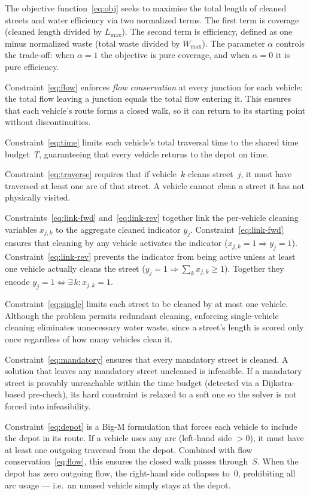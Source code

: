 \documentclass[11pt]{article}
\begin{document}
The objective function~\eqref{eq:obj} seeks to maximise the total length of
cleaned streets and water efficiency via two normalized terms. The first
term is coverage (cleaned length divided by $L_{\max}$). The second term is
efficiency, defined as one minus normalized waste (total waste divided by
$W_{\max}$).  The parameter $\alpha$ controls the trade-off: when
$\alpha = 1$ the objective is pure coverage, and when $\alpha = 0$ it is
pure efficiency.

Constraint~\eqref{eq:flow} enforces \emph{flow conservation} at every
junction for each vehicle: the total flow leaving a junction equals the
total flow entering it.  This ensures that each vehicle's route forms a
closed walk, so it can return to its starting point without discontinuities.

Constraint~\eqref{eq:time} limits each vehicle's total traversal time to
the shared time budget~$T$, guaranteeing that every vehicle returns to the
depot on time.

Constraint~\eqref{eq:traverse} requires that if vehicle~$k$ cleans
street~$j$, it must have traversed at least one arc of that street.  A
vehicle cannot clean a street it has not physically visited.

Constraints~\eqref{eq:link-fwd} and~\eqref{eq:link-rev} together link the
per-vehicle cleaning variables $x_{j,k}$ to the aggregate cleaned indicator
$y_j$.  Constraint~\eqref{eq:link-fwd} ensures that cleaning by any
vehicle activates the indicator ($x_{j,k} = 1 \Rightarrow y_j = 1$).
Constraint~\eqref{eq:link-rev} prevents the indicator from being active
unless at least one vehicle actually cleans the street ($y_j = 1
\Rightarrow \sum_k x_{j,k} \ge 1$).  Together they encode $y_j = 1
\Leftrightarrow \exists\, k : x_{j,k} = 1$.

Constraint~\eqref{eq:single} limits each street to be cleaned by at most
one vehicle.  Although the problem permits redundant cleaning, enforcing
single-vehicle cleaning eliminates unnecessary water waste, since a
street's length is scored only once regardless of how many vehicles clean
it.

Constraint~\eqref{eq:mandatory} ensures that every mandatory street is
cleaned.  A solution that leaves any mandatory street uncleaned is
infeasible.  If a mandatory street is provably unreachable within the time
budget (detected via a Dijkstra-based pre-check), its hard constraint is
relaxed to a soft one so the solver is not forced into infeasibility.

Constraint~\eqref{eq:depot} is a Big-M formulation that forces each
vehicle to include the depot in its route.  If a vehicle uses any arc
(left-hand side ${} > 0$), it must have at least one outgoing traversal from
the depot.  Combined with flow conservation~\eqref{eq:flow}, this ensures
the closed walk passes through~$S$.  When the depot has zero outgoing flow,
the right-hand side collapses to~$0$, prohibiting all arc usage --- i.e.\
an unused vehicle simply stays at the depot.
\end{document}
